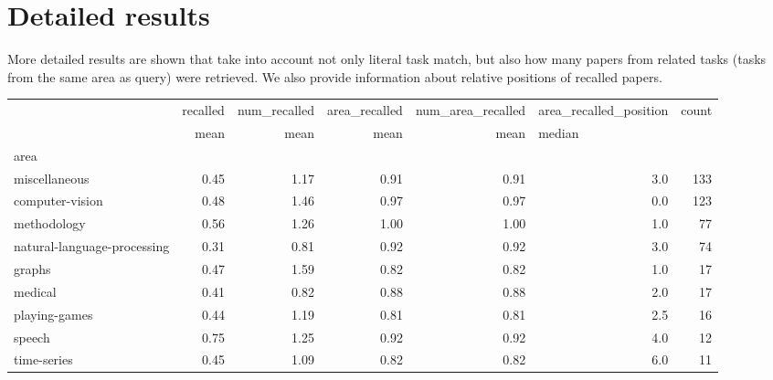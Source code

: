 \documentclass[longabstract,mgr,english]{iithesis}
\begin{document}
\section{Detailed results}

More detailed results are shown that take into account not only literal task match, but also how many papers from related tasks (tasks from the same area as query) were retrieved. We also provide information about relative positions of recalled papers.

{
\color{red}
\begin{center}
\begin{tabular}{p{1cm}rrrrrr}
\toprule
{} & recalled & num\_recalled & area\_recalled & num\_area\_recalled & area\_recalled\_position & count \\
{} &     mean &         mean &          mean &              mean & \multicolumn{2}{l}{median} \\
area                        &          &              &               &                   &                        &       \\
\midrule
miscellaneous               &     0.45 &         1.17 &          0.91 &              0.91 &                    3.0 &   133 \\
computer-vision             &     0.48 &         1.46 &          0.97 &              0.97 &                    0.0 &   123 \\
methodology                 &     0.56 &         1.26 &          1.00 &              1.00 &                    1.0 &    77 \\
natural-language-processing &     0.31 &         0.81 &          0.92 &              0.92 &                    3.0 &    74 \\
graphs                      &     0.47 &         1.59 &          0.82 &              0.82 &                    1.0 &    17 \\
medical                     &     0.41 &         0.82 &          0.88 &              0.88 &                    2.0 &    17 \\
playing-games               &     0.44 &         1.19 &          0.81 &              0.81 &                    2.5 &    16 \\
speech                      &     0.75 &         1.25 &          0.92 &              0.92 &                    4.0 &    12 \\
time-series                 &     0.45 &         1.09 &          0.82 &              0.82 &                    6.0 &    11 \\

\end{tabular}
\end{center}}
\end{document}
